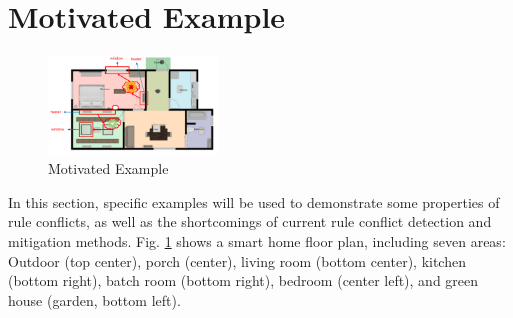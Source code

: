 \section{Motivated Example}

\begin{figure}[htbp]
	\centering
	\includegraphics[width=0.4\textwidth]{figure/motivated_example.png}
	\caption{Motivated Example}
	\label{motivated_example}
\end{figure}

In this section, specific examples will be used to demonstrate some properties of rule conflicts, as well as the shortcomings of current rule conflict detection and mitigation methods. Fig. \ref{motivated_example} shows a smart home floor plan, including seven areas: Outdoor (top center), porch (center), living room (bottom center), kitchen (bottom right), batch room (bottom right), bedroom (center left), and green house (garden, bottom left).

